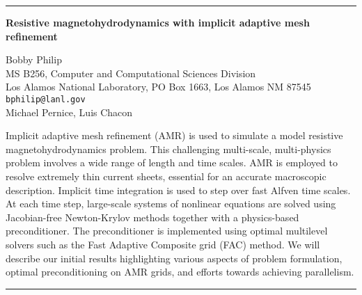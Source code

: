 \documentclass[twosided]{report}
\begin{document}
	\begin{center} \rule{6in}{1pt} \end{center}

\begin{center}
{\large			%
{\bf Resistive magnetohydrodynamics with implicit adaptive mesh refinement}}

	Bobby Philip \\
	MS B256, Computer and Computational Sciences Division \\
	Los Alamos National Laboratory, PO Box 1663, Los Alamos NM 87545 \\
	{\tt bphilip@lanl.gov} \\
	Michael Pernice, Luis Chacon
\end{center}
Implicit adaptive mesh refinement (AMR) is used to simulate
a model resistive magnetohydrodynamics problem. This
challenging multi-scale, multi-physics problem involves a
wide range of length and time scales. AMR is employed to
resolve extremely thin current sheets, essential for an
accurate macroscopic description. Implicit time integration
is used to step over fast Alfven time scales. At each time
step, large-scale systems of nonlinear equations are solved
using Jacobian-free Newton-Krylov methods together with a
physics-based preconditioner. The preconditioner is
implemented using optimal multilevel solvers such as the
Fast Adaptive Composite grid (FAC) method. We will describe
our initial results highlighting various aspects of problem
formulation, optimal preconditioning on AMR grids, and
efforts towards achieving parallelism.



	\begin{center} \rule{6in}{1pt} \end{center}
\end{document}
